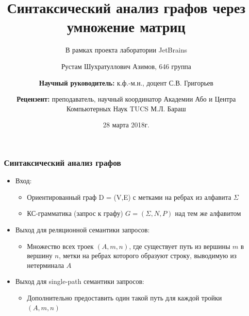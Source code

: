 \documentclass{beamer}
\title[]{Синтаксический анализ графов через умножение матриц}
\subtitle[]{В рамках проекта лаборатории JetBrains}
\institute[СПбГУ]{
	Санкт-Петербургский Государственный Университет \\
	Кафедра системного программирования }
\author[Рустам Азимов]{Рустам Шухратуллович Азимов, 646 группа \\
	\and  
	{\bfseries Научный руководитель:} к.ф.-м.н., доцент С.В. Григорьев \\ 
	\and
	{\bfseries Рецензент:} преподаватель, научный координатор Академии Або и Центра Компьютерных Наук TUCS М.Л. Бараш}
\date{28 марта 2018г.}
\begin{document}
{
\begin{frame}
  \titlepage
\end{frame}
}

\begin{frame}[fragile]
	\transwipe[direction=90]
	\frametitle{Синтаксический анализ графов}
	\begin{itemize}
	   \item Вход:
	   \begin{itemize}
	        \item Ориентированный граф D = (V,E) с метками на ребрах из алфавита $\Sigma$
	        \item КС-грамматика (запрос к графу) $G = (\Sigma,N,P)$ над тем же алфавитом
	   \end{itemize}
	   \item Выход для реляционной семантики запросов:
	   \begin{itemize}
	        \item Множество всех троек $(A, m, n)$, где существует путь из вершины $m$ в вершину $n$, метки на ребрах которого образуют строку, выводимую из нетерминала $A$
	   \end{itemize}
   	   \item Выход для single-path семантики запросов:
   	   \begin{itemize}
   			\item Дополнительно предоставить один такой путь для каждой тройки $(A, m, n)$
   	   \end{itemize}
    \end{itemize}
\end{frame}
\end{document}
